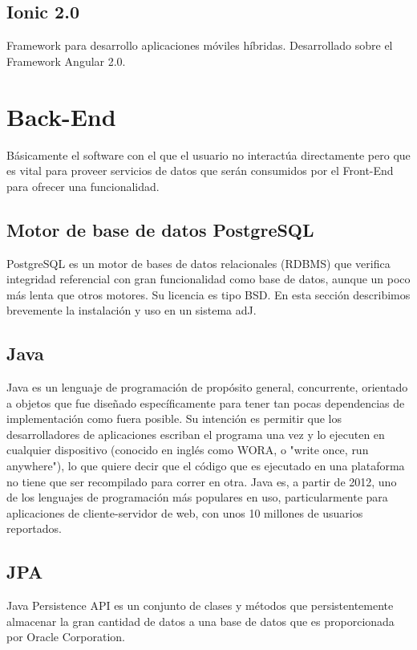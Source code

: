 \subsection{Ionic 2.0}

Framework para desarrollo aplicaciones móviles híbridas. Desarrollado sobre el Framework Angular 2.0. 

\section{Back-End}

Básicamente el software con el que el usuario no interactúa directamente pero que es vital para proveer servicios de datos que serán consumidos por el Front-End para ofrecer una funcionalidad.

\subsection{Motor de base de datos PostgreSQL}

PostgreSQL es un motor de bases de datos relacionales (RDBMS) que verifica integridad referencial con gran funcionalidad como base de datos, aunque un poco más lenta que otros motores. Su licencia es tipo BSD. En esta sección describimos brevemente la instalación y uso en un sistema adJ.

\subsection{Java}

Java es un lenguaje de programación de propósito general, concurrente, orientado a objetos que fue diseñado específicamente para tener tan pocas dependencias de implementación como fuera posible. Su intención es permitir que los desarrolladores de aplicaciones escriban el programa una vez y lo ejecuten en cualquier dispositivo (conocido en inglés como WORA, o "write once, run anywhere"), lo que quiere decir que el código que es ejecutado en una plataforma no tiene que ser recompilado para correr en otra. Java es, a partir de 2012, uno de los lenguajes de programación más populares en uso, particularmente para aplicaciones de cliente-servidor de web, con unos 10 millones de usuarios reportados.

\subsection{JPA}

Java Persistence API es un conjunto de clases y métodos que persistentemente almacenar la gran cantidad de datos a una base de datos que es proporcionada por Oracle Corporation.

